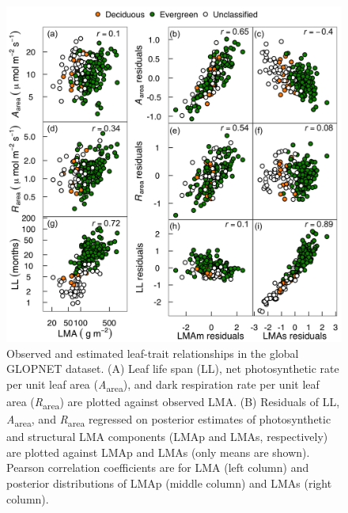 \documentclass[
  12pt,
  a4paper,
,tablecaptionabove
]{scrartcl}
\begin{document}
\begin{figure}
\hypertarget{fig:GLplt}{%
\centering
\includegraphics{../figs/GL_3.png}
\caption{Observed and estimated leaf-trait relationships in the global GLOPNET dataset.
(A) Leaf life span (LL), net photosynthetic rate per unit leaf area (\emph{A}\textsubscript{area}), and dark respiration rate per unit leaf area (\emph{R}\textsubscript{area}) are plotted against observed LMA.
(B) Residuals of LL, \emph{A}\textsubscript{area}, and \emph{R}\textsubscript{area} regressed on posterior estimates of photosynthetic and structural LMA components (LMAp and LMAs, respectively) are plotted against LMAp and LMAs (only means are shown).
Pearson correlation coefficients are for LMA (left column) and posterior distributions of LMAp (middle column) and LMAs (right column).}\label{fig:GLplt}
}
\end{figure}

\newpage
\end{document}
